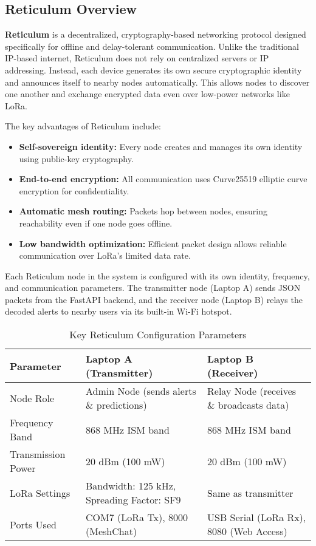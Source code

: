 \subsection{Reticulum Overview}

\textbf{Reticulum} is a decentralized, cryptography-based networking protocol designed specifically for offline and delay-tolerant communication. Unlike the traditional IP-based internet, Reticulum does not rely on centralized servers or IP addressing. Instead, each device generates its own secure cryptographic identity and announces itself to nearby nodes automatically. This allows nodes to discover one another and exchange encrypted data even over low-power networks like LoRa.

The key advantages of Reticulum include:
\begin{itemize}
    \item \textbf{Self-sovereign identity:} Every node creates and manages its own identity using public-key cryptography.
    \item \textbf{End-to-end encryption:} All communication uses Curve25519 elliptic curve encryption for confidentiality.
    \item \textbf{Automatic mesh routing:} Packets hop between nodes, ensuring reachability even if one node goes offline.
    \item \textbf{Low bandwidth optimization:} Efficient packet design allows reliable communication over LoRa’s limited data rate.
\end{itemize}

Each Reticulum node in the system is configured with its own identity, frequency, and communication parameters. The transmitter node (Laptop A) sends JSON packets from the FastAPI backend, and the receiver node (Laptop B) relays the decoded alerts to nearby users via its built-in Wi-Fi hotspot.

\begin{table}[H]
\centering
\caption{Key Reticulum Configuration Parameters}
\label{tab:reticulum_config_simplified}
\begin{tabular}{|p{3.5cm}|p{5cm}|p{5cm}|}
\hline
\textbf{Parameter} & \textbf{Laptop A (Transmitter)} & \textbf{Laptop B (Receiver)} \\
\hline
Node Role & Admin Node (sends alerts \& predictions) & Relay Node (receives \& broadcasts data) \\
\hline
Frequency Band & 868 MHz ISM band & 868 MHz ISM band \\
\hline
Transmission Power & 20 dBm (100 mW) & 20 dBm (100 mW) \\
\hline
LoRa Settings & Bandwidth: 125 kHz, Spreading Factor: SF9 & Same as transmitter \\
\hline
Ports Used & COM7 (LoRa Tx), 8000 (MeshChat) & USB Serial (LoRa Rx), 8080 (Web Access) \\
\hline
\end{tabular}
\end{table}

